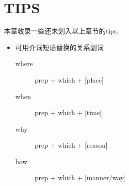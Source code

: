 \chapter{TIPS}

本章收录一些还未划入以上章节的tips.


\begin{itemize}

\item 可用介词短语替换的关系副词
  \begin{description}
  \item[where] prep + which + [place]
  \item[when] prep + which + [time]
  \item[why] prep + which + [reason]
  \item[how] prep + which + [manner/way]
  \end{description}

\end{itemize}
